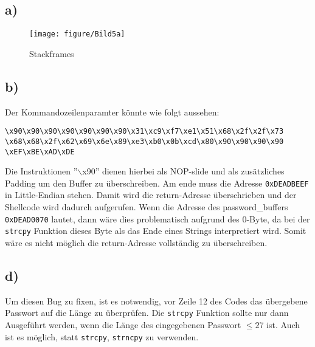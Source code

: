 \documentclass[]{scrreprt}
\begin{document}
	\subsection*{a)}
	\begin{figure}[h]
		\centering
		\texttt{[image: figure/Bild5a]} 
		\caption{Stackframes}
	\end{figure}
	\subsection*{b)}
	Der Kommandozeilenparamter könnte wie folgt aussehen:\newline
	\begin{lstlisting}[frame=single, caption={Kommandozeilenparamter ($\hat{=}$ einer Zeile)},captionpos=b]
\x90\x90\x90\x90\x90\x90\x90\x31\xc9\xf7\xe1\x51\x68\x2f\x2f\x73
\x68\x68\x2f\x62\x69\x6e\x89\xe3\xb0\x0b\xcd\x80\x90\x90\x90\x90
\xEF\xBE\xAD\xDE
	\end{lstlisting}
	Die Instruktionen ''$\backslash$x90'' dienen hierbei als NOP-slide und als zusätzliches Padding um den Buffer zu überschreiben. Am ende muss die Adresse \texttt{0xDEADBEEF} in Little-Endian stehen. Damit wird die return-Adresse überschrieben und der Shellcode wird dadurch aufgerufen.\newline
	Wenn die Adresse des password\_buffers \texttt{0xDEAD0070} lautet, dann wäre dies problematisch aufgrund des 0-Byte, da bei der \texttt{strcpy} Funktion dieses Byte als das Ende eines Strings interpretiert wird. Somit wäre es nicht möglich die return-Adresse vollständig zu überschreiben.
	\subsection*{d)}
	Um diesen Bug zu fixen, ist es notwendig, vor Zeile 12 des Codes das übergebene Passwort auf die Länge zu überprüfen. Die \texttt{strcpy} Funktion sollte nur dann Ausgeführt werden, wenn die Länge des eingegebenen Passwort $\leq 27$ ist.
	Auch ist es möglich, statt \texttt{strcpy}, \texttt{strncpy} zu verwenden.
	
\end{document}
